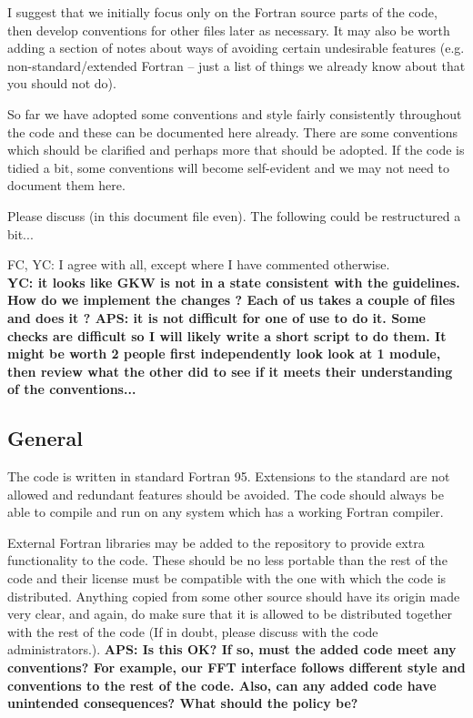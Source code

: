 \documentclass[12pt,twoside,notitlepage,a4paper]{article}
\begin{document}
I suggest that we initially focus only on the Fortran source parts of the code, then
develop conventions for other files later as necessary. It may also be worth adding
a section of notes about ways of avoiding certain undesirable features (e.g.
non-standard/extended Fortran -- just a list of things we already know about that you should not
do).

So far we have adopted some conventions and style fairly consistently throughout the code
and these can be documented here already. There are some conventions which should be
clarified and perhaps more that should be adopted. If the code is tidied a bit, some
conventions will become self-evident and we may not need to document them here.

Please discuss (in this document file even). The following could be restructured a bit...

FC, YC:  I agree with all, except where I have commented otherwise.\\
{\bf YC: it looks like GKW is not in a state consistent with the guidelines. How do we implement the changes ?
Each of us takes a couple of files and does it ? APS: it is not difficult for one of use to do it. Some checks
are difficult so I will likely write a short script to do them. It might be
worth 2 people first independently look look at 1 module, then review what the other did to see
if it meets their understanding of the conventions...}

\subsection{General}

The code is written in standard Fortran 95. Extensions to the standard are not
allowed and redundant features should be avoided. The code should always
be able to compile and run on any system which has a working Fortran compiler.

External Fortran libraries may be added to the repository to provide extra     
functionality to the code. These should be no less portable than the rest
of the code and their license must be compatible with the one with which the
code is distributed. Anything copied from some other source should have its
origin made very clear, and again, do make sure that it is allowed to
be distributed together with the rest of the code (If in doubt, please
discuss with the code administrators.). 
{\bf APS: Is this OK? If so, must the added code meet any conventions? For example, 
our FFT interface follows different style and conventions to the rest of the code.
Also, can any added code have unintended consequences? What should the policy be?}
\end{document}
